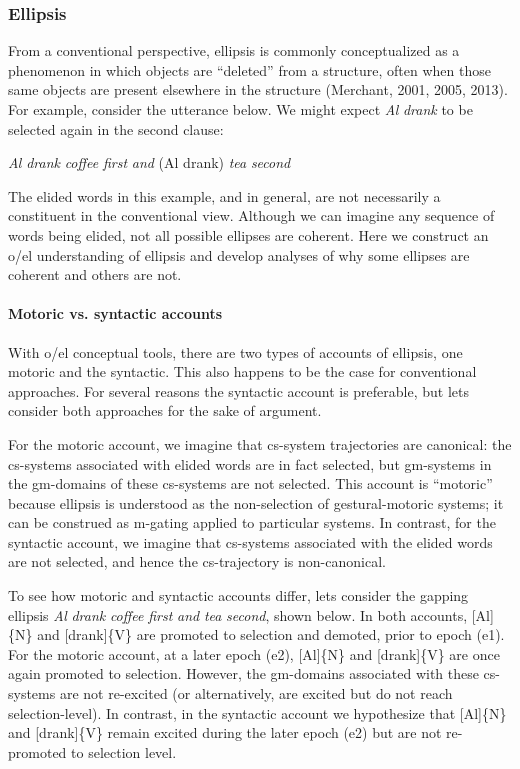 \subsubsection{Ellipsis}

From a conventional perspective, ellipsis is commonly conceptualized as a phenomenon in which objects are “deleted” from a structure, often when those same objects are present elsewhere in the structure (Merchant, 2001, 2005, 2013). For example, consider the utterance below. We might expect \textit{Al} \textit{drank} to be selected again in the second clause:

    \textit{Al} \textit{drank} \textit{coffee} \textit{first} \textit{and} (Al drank) \textit{tea} \textit{second}

  The elided words in this example, and in general, are not necessarily a constituent in the conventional view. Although we can imagine any sequence of words being elided, not all possible ellipses are coherent. Here we construct an o/el understanding of ellipsis and develop analyses of why some ellipses are coherent and others are not.

\paragraph{Motoric vs. syntactic accounts}

With o/el conceptual tools, there are two types of accounts of ellipsis, one motoric and the syntactic. This also happens to be the case for conventional approaches. For several reasons the syntactic account is preferable, but lets consider both approaches for the sake of argument. 

  For the motoric account, we imagine that cs-system trajectories are canonical: the cs-systems associated with elided words are in fact selected, but gm-systems in the gm-domains of these cs-systems are not selected. This account is “motoric” because ellipsis is understood as the non-selection of gestural-motoric systems; it can be construed as m-gating applied to particular systems. In contrast, for the syntactic account, we imagine that cs-systems associated with the elided words are not selected, and hence the cs-trajectory is non-canonical.

  To see how motoric and syntactic accounts differ, lets consider the gapping ellipsis \textit{Al} \textit{drank} \textit{coffee} \textit{first} \textit{and} \textit{tea} \textit{second}, shown below. In both accounts, [Al]\{N\} and [drank]\{V\} are promoted to selection and demoted, prior to epoch (e1). For the motoric account, at a later epoch (e2), [Al]\{N\} and [drank]\{V\} are once again promoted to selection. However, the gm-domains associated with these cs-systems are not re-excited (or alternatively, are excited but do not reach selection-level). In contrast, in the syntactic account we hypothesize that [Al]\{N\} and [drank]\{V\} remain excited during the later epoch (e2) but are not re-promoted to selection level. 

